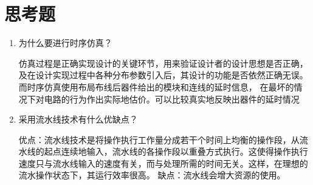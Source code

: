 \documentclass{../source/Experiment}
\begin{document}
        \section{思考题}
            \begin{enumerate}
                \item 为什么要进行时序仿真？
                
                仿真过程是正确实现设计的关键环节，用来验证设计者的设计思想是否正确，及在设计实现过程中各种分布参数引入后，其设计的功能是否依然正确无误。
                而时序仿真使用布局布线后器件给出的模块和连线的延时信息， 在最坏的情况下对电路的行为作出实际地估价。可以比较真实地反映出器件的延时情况

                \item 采用流水线技术有什么优缺点？
                
                优点：流水线技术是将操作执行工作量分成若干个时间上均衡的操作段，从流水线的起点连续地输入，流水线的各操作段以重叠方式执行。这使得操作执行速度只与流水线输入的速度有关，而与处理所需的时间无关。这样，在理想的流水操作状态下，其运行效率很高。
                缺点：流水线会增大资源的使用。
            \end{enumerate}
\end{document}
